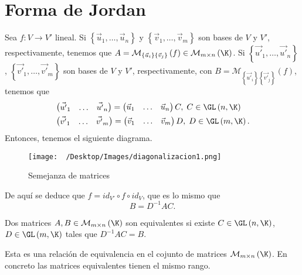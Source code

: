 \chapter{Forma de Jordan}
Sea $\displaystyle f : V \to V' $ lineal. Si $\displaystyle \left\{ \vec{u}_{1}, \ldots, \vec{u}_{n}\right\}  $ y $\displaystyle \left\{ \vec{v}_{1}, \ldots, \vec{v}_{m}\right\}  $ son bases de $\displaystyle V $ y $\displaystyle V' $, respectivamente, tenemos que $\displaystyle A =\mathcal{M}_{ \left\{ \vec{u}_{i}\right\} \left\{ \vec{v}_{j}\right\} }\left(f\right) \in \mathcal{M}_{m \times n} \left(\K\right) $. Si $\displaystyle \left\{ \vec{u'}_{1}, \ldots, \vec{u'}_{n}\right\}  $, $\displaystyle \left\{ \vec{v'}_{1}, \ldots, \vec{v'}_{m}\right\}  $ son bases de $\displaystyle V $ y $\displaystyle V' $, respectivamente, con $\displaystyle B =\mathcal{M}_{ \left\{ \vec{u'}_{i}\right\} \left\{ \vec{v'}_{j}\right\} }\left(f\right) $, tenemos que
\[
\begin{split}
	& \begin{pmatrix} \vec{u'}_{1} & \ldots & \vec{u'}_{n} \end{pmatrix} = \begin{pmatrix} \vec{u}_{1} & \ldots & \vec{u}_{n} \end{pmatrix} C, \; C \in \GL\left(n, \K\right) \\
	& \begin{pmatrix} \vec{v'}_{1} & \ldots & \vec{v'}_{m} \end{pmatrix} = \begin{pmatrix} \vec{v}_{1} & \ldots & \vec{v}_{m} \end{pmatrix} D, \; D \in \GL\left(m, \K\right).
\end{split}
\]
Entonces, tenemos el siguiente diagrama. 
\begin{figure}
\centering
\texttt{[image: ~/Desktop/Images/diagonalizacion1.png]}
\caption{Semejanza de matrices}
\label{ }
\end{figure}
De aquí se deduce que $\displaystyle f = id _{V'} \circ f \circ id _{V} $, que es lo mismo que
\[B = D^{-1}AC .\]
\begin{fdefinition}[]
	\normalfont Dos matrices $\displaystyle A,B \in \mathcal{M}_{m \times n}\left(\K\right) $ son equivalentes si existe $\displaystyle C \in \GL\left(n, \K\right) $, $\displaystyle D \in \GL\left(m, \K\right) $ tales que $\displaystyle D^{-1}AC = B $.
\end{fdefinition}

\begin{observation}
\normalfont Esta es una relación de equivalencia en el cojunto de matrices $\displaystyle \mathcal{M}_{m \times n}\left(\K\right) $. En concreto las matrices equivalentes tienen el mismo rango.
\end{observation}

